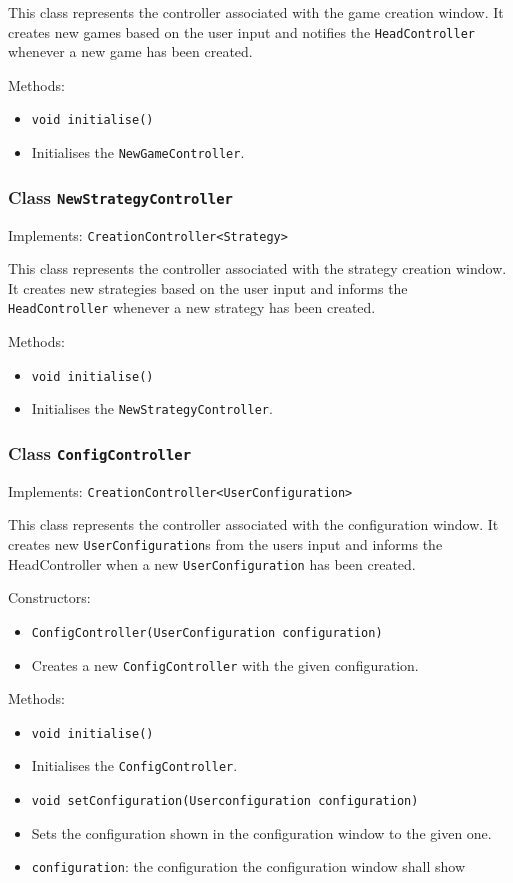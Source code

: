 \documentclass[parskip=full,11pt]{scrartcl}
\begin{document}
This class represents the controller associated with the game creation window. It creates new games based on the user input and notifies the \texttt{HeadController} whenever a new game has been created.

Methods:
\begin{itemize}\itemsep -10pt
\item \texttt{void initialise()}
\item[] Initialises the \texttt{NewGameController}.
\end{itemize}

\subsubsection{Class \texttt{NewStrategyController}}
Implements: \texttt{CreationController<Strategy>}

This class represents the controller associated with the strategy creation window. It creates new strategies based on the user input and informs the \texttt{HeadController} whenever a new strategy has been created.

Methods:
\begin{itemize}\itemsep -10pt
\item \texttt{void initialise()}
\item[] Initialises the \texttt{NewStrategyController}.
\end{itemize}

\subsubsection{Class \texttt{ConfigController}}
Implements: \texttt{CreationController<UserConfiguration>}

This class represents the controller associated with the configuration window. It creates new \texttt{UserConfiguration}s from the users input and informs the HeadController when a new \texttt{UserConfiguration} has been created.

Constructors:
\begin{itemize}\itemsep -10pt
\item \texttt{ConfigController(UserConfiguration configuration)}
\item[] Creates a new \texttt{ConfigController} with the given configuration.
\end{itemize}

Methods:
\begin{itemize}\itemsep -10pt
\item \texttt{void initialise()}
\item[] Initialises the \texttt{ConfigController}.

\item \texttt{void setConfiguration(Userconfiguration configuration)}
\item[] Sets the configuration shown in the configuration window to the given one.
\item[] \texttt{configuration}: the configuration the configuration window shall show

\end{itemize}
\end{document}
